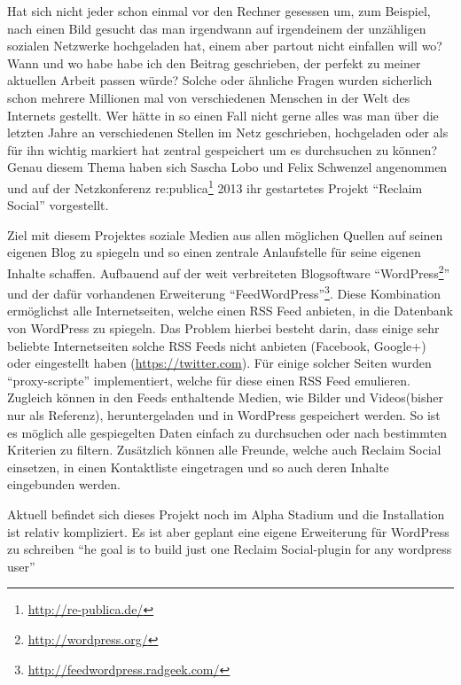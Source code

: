Hat sich nicht jeder schon einmal vor den Rechner gesessen um, zum Beispiel, nach einen Bild gesucht das man irgendwann auf irgendeinem der unzähligen sozialen Netzwerke hochgeladen hat, einem aber partout nicht einfallen will wo? Wann und wo habe habe ich den Beitrag geschrieben, der perfekt zu meiner aktuellen Arbeit passen würde? Solche oder ähnliche Fragen wurden sicherlich schon mehrere Millionen mal von verschiedenen Menschen in der Welt des Internets gestellt. Wer hätte in so einen Fall nicht gerne alles was man über die letzten Jahre an verschiedenen Stellen im Netz geschrieben, hochgeladen oder als für ihn wichtig markiert hat zentral gespeichert um es durchsuchen zu können? Genau diesem Thema haben sich Sascha Lobo und Felix Schwenzel angenommen und auf der Netzkonferenz re:publica\footnote{\url{http://re-publica.de/}} 2013 ihr gestartetes Projekt \enquote{Reclaim Social} \cite{Schwenzel2013} vorgestellt.


Ziel mit diesem Projektes soziale Medien aus allen möglichen Quellen auf seinen eigenen Blog zu spiegeln und so einen zentrale Anlaufstelle für seine eigenen Inhalte schaffen. Aufbauend auf der weit verbreiteten Blogsoftware \enquote{WordPress\footnote{\url{http://wordpress.org/}}} und der dafür vorhandenen Erweiterung \enquote{FeedWordPress}\footnote{\url{http://feedwordpress.radgeek.com/}}. Diese Kombination ermöglichst alle Internetseiten, welche einen RSS Feed anbieten, in die Datenbank von WordPress zu spiegeln. Das Problem hierbei besteht darin, dass einige sehr beliebte Internetseiten solche RSS Feeds nicht anbieten (Facebook, Google+) oder eingestellt haben (\url{https://twitter.com}). Für einige solcher Seiten wurden \enquote{proxy-scripte}\cite[Tech Specs Details]{Schwenzel2013} implementiert, welche für diese einen RSS Feed emulieren. Zugleich können in den Feeds enthaltende Medien, wie Bilder und Videos(bisher nur als Referenz), heruntergeladen und in WordPress gespeichert werden. So ist es möglich alle gespiegelten Daten einfach zu durchsuchen oder nach bestimmten Kriterien zu filtern. Zusätzlich können alle Freunde, welche auch Reclaim Social einsetzen, in einen Kontaktliste eingetragen und so auch deren Inhalte eingebunden werden.

Aktuell befindet sich dieses Projekt noch im Alpha Stadium und die Installation ist relativ kompliziert. Es ist aber geplant eine eigene Erweiterung für WordPress zu schreiben \enquote{he goal is to build just one Reclaim Social-plugin for any wordpress user}\cite[How Does It Work]{Schwenzel2013}



